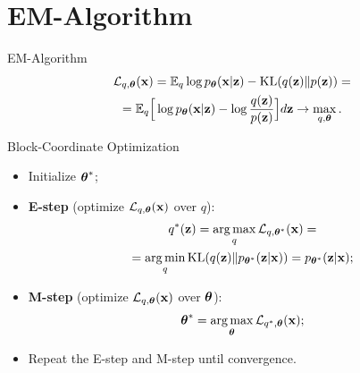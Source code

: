 \documentclass{beamer}
\begin{document}
\section{EM-Algorithm}
\begin{frame}{EM-Algorithm}
	\vspace{-0.5cm}
	\begin{multline*}
		\mathcal{L}_{q, \boldsymbol{\theta}}(\mathbf{x})  =  \mathbb{E}_{q} \log p_{\boldsymbol{\theta}}(\mathbf{x} | \mathbf{z}) - \mathrm{KL} (q(\mathbf{z}) \| p(\mathbf{z})) = \\ = \mathbb{E}_q \Big[ \log p_{\boldsymbol{\theta}}(\mathbf{x} | \mathbf{z}) - \log \frac{q(\mathbf{z})}{p(\mathbf{z})} \Big]d\mathbf{z} \rightarrow \max_{q, \boldsymbol{\theta}}.
	\end{multline*}
    \eqpause
	\vspace{-0.5cm}
	\begin{block}{Block-Coordinate Optimization}
		\begin{itemize}
			\item Initialize $\boldsymbol{\theta}^*$;
            \eqpause
			\item \textbf{E-step} (optimize $\mathcal{L}_{q, \boldsymbol{\theta}}(\mathbf{x})$ over $q$):
			\vspace{-0.5cm}
			\begin{multline*}
				q^*(\mathbf{z}) = \operatorname*{arg\,max}_q \mathcal{L}_{q, \boldsymbol{\theta}^*}(\mathbf{x}) = \\
				= \operatorname*{arg\,min}_q \mathrm{KL}(q(\mathbf{z}) \| p_{\boldsymbol{\theta}^*}(\mathbf{z} | \mathbf{x})) = p_{\boldsymbol{\theta}^*}(\mathbf{z}| \mathbf{x});
			\end{multline*}
            \eqpause
			\vspace{-0.3cm}
			\item \textbf{M-step} (optimize $\mathcal{L}_{q, \boldsymbol{\theta}}(\mathbf{x})$ over $\boldsymbol{\theta}$):
			\vspace{-0.2cm}
			\[
				\boldsymbol{\theta}^* = \operatorname*{arg\,max}_{\boldsymbol{\theta}} \mathcal{L}_{q^*, \boldsymbol{\theta}}(\mathbf{x});
			\]
			\vspace{-0.3cm}
            \eqpause
			\item Repeat the E-step and M-step until convergence.
		\end{itemize}
	\end{block}
\end{frame}
\end{document}
